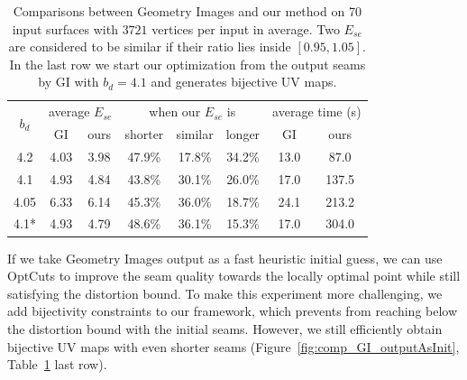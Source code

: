 \begin{table}[!h]
\centering
\caption{Comparisons between Geometry Images and our method on 70 input surfaces with $3721$ vertices per input in average. Two $E_{se}$ are considered to be similar if their ratio lies inside $[0.95, 1.05]$. In the last row we start our optimization from the output seams by GI with $b_d = 4.1$ and generates bijective UV maps.} 
\label{tb:comp_GI}
\begin{tabular}{@{}cccccccc@{}}
\toprule
\multirow{2}{*}{$b_d$} & \multicolumn{2}{c}{average $E_{se}$}             & \multicolumn{3}{c}{when our $E_{se}$ is}                         & \multicolumn{2}{c}{average time (s)}       \\ \cmidrule(l){2-8} 
                   & GI & ours & shorter & similar & longer & GI & ours \\ \midrule
4.2                & 4.03             & 3.98           &  47.9\%  & 17.8\%  & 34.2\% & 13.0          & 87.0        \\
4.1                & 4.93             & 4.84           &  43.8\%  & 30.1\%  & 26.0\% & 17.0        & 137.5        \\
4.05               & 6.33             & 6.14           &  45.3\%  & 36.0\%  & 18.7\% &  24.1        & 213.2        \\ 
4.1*               & 4.93             & 4.79           &  48.6\%  & 36.1\%  & 15.3\% &  17.0        & 304.0        \\ \bottomrule
\end{tabular}
\end{table}

If we take Geometry Images output as a fast heuristic initial guess, we can use OptCuts to improve the seam quality towards the locally optimal point while still satisfying the distortion bound. To make this experiment more challenging, we add bijectivity constraints to our framework, which prevents from reaching below the distortion bound with the initial seams. However, we still efficiently obtain bijective UV maps with even shorter seams (Figure~\ref{fig:comp_GI_outputAsInit}, Table~\ref{tb:comp_GI} last row).

